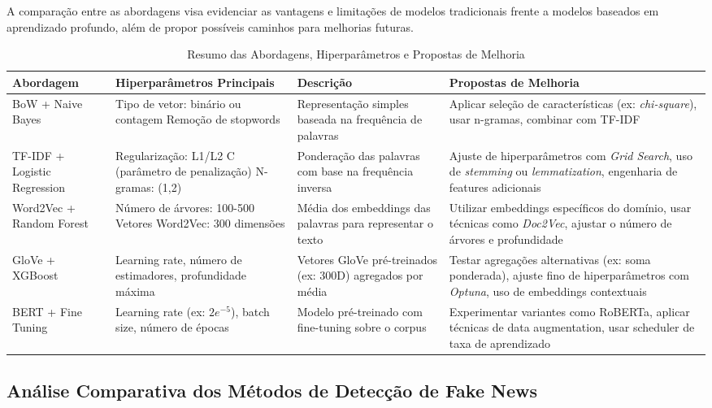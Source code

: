 \documentclass[conference]{IEEEtran}
\begin{document}
A comparação entre as abordagens visa evidenciar as vantagens e limitações de modelos tradicionais frente a modelos baseados em aprendizado profundo, além de propor possíveis caminhos para melhorias futuras.

\begin{table}[h]
\centering
\caption{Resumo das Abordagens, Hiperparâmetros e Propostas de Melhoria}
\begin{tabular}{|l|p{4cm}|p{4cm}|p{5cm}|}
\hline
\textbf{Abordagem} & \textbf{Hiperparâmetros Principais} & \textbf{Descrição} & \textbf{Propostas de Melhoria} \\
\hline
BoW + Naive Bayes & Tipo de vetor: binário ou contagem \newline Remoção de stopwords & Representação simples baseada na frequência de palavras & Aplicar seleção de características (ex: \textit{chi-square}), usar n-gramas, combinar com TF-IDF \\
\hline
TF-IDF + Logistic Regression & Regularização: L1/L2 \newline C (parâmetro de penalização) \newline N-gramas: (1,2) & Ponderação das palavras com base na frequência inversa & Ajuste de hiperparâmetros com \textit{Grid Search}, uso de \textit{stemming} ou \textit{lemmatization}, engenharia de features adicionais \\
\hline
Word2Vec + Random Forest & Número de árvores: 100-500 \newline Vetores Word2Vec: 300 dimensões & Média dos embeddings das palavras para representar o texto & Utilizar embeddings específicos do domínio, usar técnicas como \textit{Doc2Vec}, ajustar o número de árvores e profundidade \\
\hline
GloVe + XGBoost & Learning rate, número de estimadores, profundidade máxima & Vetores GloVe pré-treinados (ex: 300D) agregados por média & Testar agregações alternativas (ex: soma ponderada), ajuste fino de hiperparâmetros com \textit{Optuna}, uso de embeddings contextuais \\
\hline
BERT + Fine Tuning & Learning rate (ex: $2e^{-5}$), batch size, número de épocas & Modelo pré-treinado com fine-tuning sobre o corpus & Experimentar variantes como RoBERTa, aplicar técnicas de data augmentation, usar scheduler de taxa de aprendizado \\
\hline
\end{tabular}
\end{table}

\subsection{Análise Comparativa dos Métodos de Detecção de Fake News}
\end{document}
